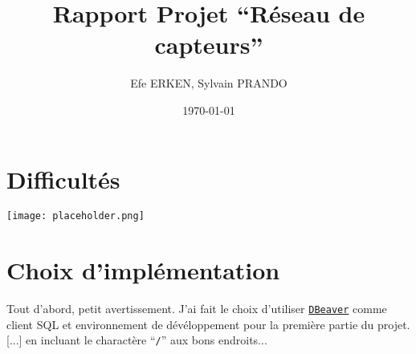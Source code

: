 \documentclass[12pt]{article}
\author{Efe ERKEN, Sylvain PRANDO}
\date{\today}
\title{Rapport Projet ``Réseau de capteurs''}
\begin{document}
\maketitle

\section{Difficultés}
\begin{center}
	\texttt{[image: placeholder.png]}
\end{center}

\section{Choix d'implémentation}
Tout d'abord, petit avertissement. J'ai fait le choix d'utiliser
\href{https://dbeaver.io/}{\texttt{DBeaver}} comme client SQL et environnement
de dévéloppement pour la première partie du projet. [...] en incluant le charactère
``\texttt{/}'' aux bons endroits... \\
\end{document}

